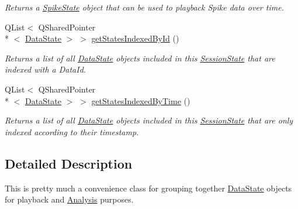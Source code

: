 \begin{DoxyCompactItemize}
\begin{DoxyCompactList}\small\item\em Returns a \hyperlink{class_picto_1_1_spike_state}{Spike\-State} object that can be used to playback Spike data over time. \end{DoxyCompactList}\item 
Q\-List$<$ Q\-Shared\-Pointer\\*
$<$ \hyperlink{class_picto_1_1_data_state}{Data\-State} $>$ $>$ \hyperlink{class_picto_1_1_session_state_a9e6a96eed8ed02bd34b28d695a24262a}{get\-States\-Indexed\-By\-Id} ()
\begin{DoxyCompactList}\small\item\em Returns a list of all \hyperlink{class_picto_1_1_data_state}{Data\-State} objects included in this \hyperlink{class_picto_1_1_session_state}{Session\-State} that are indexed with a Data\-Id. \end{DoxyCompactList}\item 
Q\-List$<$ Q\-Shared\-Pointer\\*
$<$ \hyperlink{class_picto_1_1_data_state}{Data\-State} $>$ $>$ \hyperlink{class_picto_1_1_session_state_a90001c8208d8f7e7b8b5b373641a7326}{get\-States\-Indexed\-By\-Time} ()
\begin{DoxyCompactList}\small\item\em Returns a list of all \hyperlink{class_picto_1_1_data_state}{Data\-State} objects included in this \hyperlink{class_picto_1_1_session_state}{Session\-State} that are only indexed according to their timestamp. \end{DoxyCompactList}\end{DoxyCompactItemize}


\subsection{Detailed Description}
This is pretty much a convenience class for grouping together \hyperlink{class_picto_1_1_data_state}{Data\-State} objects for playback and \hyperlink{class_picto_1_1_analysis}{Analysis} purposes. 

